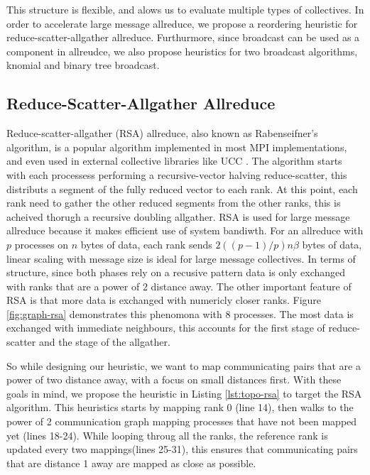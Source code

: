 This structure is flexible, and alows us to evaluate multiple types of collectives.
In order to accelerate large message allreduce, we propose a reordering heuristic for reduce-scatter-allgather allreduce.
Furthurmore, since broadcast can be used as a component in allreudce, we also propose heuristics for two broadcast algorithms, knomial and binary tree broadcast.

\subsection{Reduce-Scatter-Allgather Allreduce}


\lstset{label = lst:topo-rsa}
\lstset{caption = Heuristic for rank reordering the reduce-scatter-allgather algorithm.}


Reduce-scatter-allgather (RSA) allreduce, also known as Rabenseifner's algorithm, is a popular algorithm implemented in most MPI implementations, and even used in external collective libraries like UCC \cite{UCC}.
The algorithm starts with each processess performing a recursive-vector halving reduce-scatter, this distributs a segment of the fully reduced vector to each rank.
At this point, each rank need to gather the other reduced segments from the other ranks, this is acheived thorugh a recursive doubling allgather.
RSA is used for large message allreduce because it makes efficient use of system bandiwth.
For an allreduce with $p$ processes on $n$ bytes of data, each rank sends $2((p-1)/p)n\beta$ bytes of data, linear scaling with message size is ideal for large message collectives.
In terms of structure, since both phases rely on a recusive pattern data is only exchanged with ranks that are a power of 2 distance away.
The other important feature of RSA is that more data is exchanged with numericly closer ranks.
Figure \ref{fig:graph-rsa} demonstrates this phenomona with 8 processes.
The most data is exchanged with immediate neighbours, this accounts for the first stage of reduce-scatter and the stage of the allgather.

So while designing our heuristic, we want to map communicating pairs that are a power of two distance away, with a focus on small distances first.
With these goals in mind, we propose the heuristic in Listing \ref{lst:topo-rsa} to target the RSA algorithm.
This heuristics starts by mapping rank 0 (line 14), then walks to the power of 2 communication graph mapping processes that have not been mapped yet (lines 18-24). 
While looping throug all the ranks, the reference rank is updated every two mappings(lines 25-31), this ensures that communicating pairs that are distance 1 away are mapped as close as possible. 


